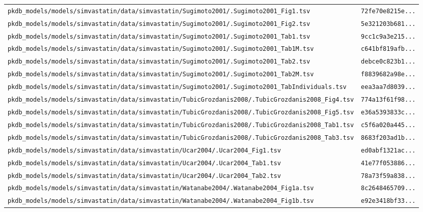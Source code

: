 \documentclass{article}
\begin{document}
\begin{longtable}{ll}
\texttt{pkdb\_models/models/simvastatin/data/simvastatin/Sugimoto2001/.Sugimoto2001\_Fig1.tsv} & \texttt{72fe70e8215e...} \\
\texttt{pkdb\_models/models/simvastatin/data/simvastatin/Sugimoto2001/.Sugimoto2001\_Fig2.tsv} & \texttt{5e321203b681...} \\
\texttt{pkdb\_models/models/simvastatin/data/simvastatin/Sugimoto2001/.Sugimoto2001\_Tab1.tsv} & \texttt{9cc1c9a3e215...} \\
\texttt{pkdb\_models/models/simvastatin/data/simvastatin/Sugimoto2001/.Sugimoto2001\_Tab1M.tsv} & \texttt{c641bf819afb...} \\
\texttt{pkdb\_models/models/simvastatin/data/simvastatin/Sugimoto2001/.Sugimoto2001\_Tab2.tsv} & \texttt{debce0c823b1...} \\
\texttt{pkdb\_models/models/simvastatin/data/simvastatin/Sugimoto2001/.Sugimoto2001\_Tab2M.tsv} & \texttt{f8839682a98e...} \\
\texttt{pkdb\_models/models/simvastatin/data/simvastatin/Sugimoto2001/.Sugimoto2001\_TabIndividuals.tsv} & \texttt{eea3aa7d8039...} \\
\texttt{pkdb\_models/models/simvastatin/data/simvastatin/TubicGrozdanis2008/.TubicGrozdanis2008\_Fig4.tsv} & \texttt{774a13f61f98...} \\
\texttt{pkdb\_models/models/simvastatin/data/simvastatin/TubicGrozdanis2008/.TubicGrozdanis2008\_Fig5.tsv} & \texttt{e36a5393833c...} \\
\texttt{pkdb\_models/models/simvastatin/data/simvastatin/TubicGrozdanis2008/.TubicGrozdanis2008\_Tab1.tsv} & \texttt{c5f6a020a445...} \\
\texttt{pkdb\_models/models/simvastatin/data/simvastatin/TubicGrozdanis2008/.TubicGrozdanis2008\_Tab3.tsv} & \texttt{8683f203ad1b...} \\
\texttt{pkdb\_models/models/simvastatin/data/simvastatin/Ucar2004/.Ucar2004\_Fig1.tsv} & \texttt{ed0abf1321ac...} \\
\texttt{pkdb\_models/models/simvastatin/data/simvastatin/Ucar2004/.Ucar2004\_Tab1.tsv} & \texttt{41e77f053886...} \\
\texttt{pkdb\_models/models/simvastatin/data/simvastatin/Ucar2004/.Ucar2004\_Tab2.tsv} & \texttt{78a73f59a838...} \\
\texttt{pkdb\_models/models/simvastatin/data/simvastatin/Watanabe2004/.Watanabe2004\_Fig1a.tsv} & \texttt{8c2648465709...} \\
\texttt{pkdb\_models/models/simvastatin/data/simvastatin/Watanabe2004/.Watanabe2004\_Fig1b.tsv} & \texttt{e92e3418bf33...} \\

\end{longtable}
\end{document}
